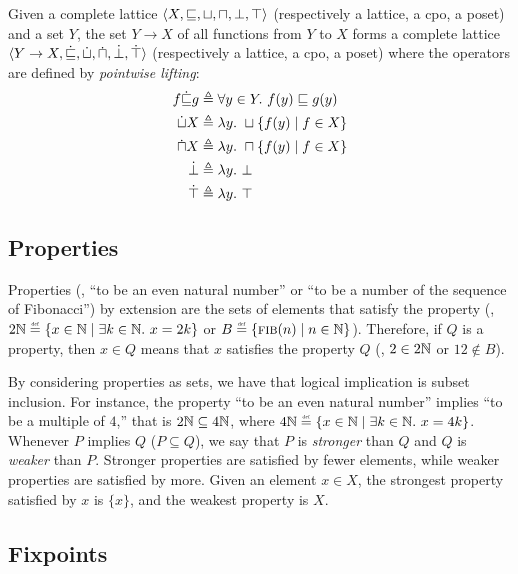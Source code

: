 \begin{definition}
  Given a complete lattice $\langle X, \sqsubseteq, \sqcup, \sqcap, \bot, \top \rangle$ (respectively a lattice, a cpo, a poset) and a set $Y$, the set $Y \to X$ of all functions from $Y$ to $X$ forms a complete lattice $\langle Y \to X, \dot{\sqsubseteq}, \dot{\sqcup}, \dot{\sqcap}, \dot{\bot}, \dot{\top} \rangle$ (respectively a lattice, a cpo, a poset) where the operators are defined by \emph{pointwise lifting}:
\begin{align*}
  f \dot{\sqsubseteq} g & \triangleq \forall y \in Y.~ f(y) \sqsubseteq g(y) \\
  \dot{\sqcup} X & \triangleq \lambda y.~ \sqcup \{f(y) \mid f \in X\} \\
  \dot{\sqcap} X & \triangleq \lambda y.~ \sqcap \{f(y) \mid f \in X\} \\
  \dot{\bot} & \triangleq \lambda y.~ \bot \\
  \dot{\top} & \triangleq \lambda y.~ \top
\end{align*}
\end{definition}


\subsection{Properties}

Properties (\eg, ``to be an even natural number'' or ``to be a number of the sequence of Fibonacci'') by extension are the sets of elements that satisfy the property (\eg, $2\N \defeq \setdef{x \in \N}{\exists k \in \N.\spacer x = 2k}$ or $B \defeq \setdef{\textsc{fib}(n)}{n\in\N}$). Therefore, if $Q$ is a property, then $x \in Q$ means that $x$ satisfies the property $Q$ (\eg, $2 \in 2\mathbb{N}$ or $12 \notin B$).

By considering properties as sets, we have that logical implication is subset inclusion. For instance, the property ``to be an even natural number'' implies ``to be a multiple of $4$,'' that is $2\mathbb{N} \subseteq 4\mathbb{N}$, where $4\N \defeq \setdef{x \in \N}{\exists k \in \N.\spacer x = 4k}$.
Whenever $P$ implies $Q$ ($P \subseteq Q$), we say that $P$ is \emph{stronger} than $Q$ and $Q$ is \emph{weaker} than $P$.
Stronger properties are satisfied by fewer elements, while weaker properties are satisfied by more.
Given an element $x \in X$, the strongest property satisfied by $x$ is $\{x\}$, and the weakest property is $X$.


\subsection{Fixpoints}

